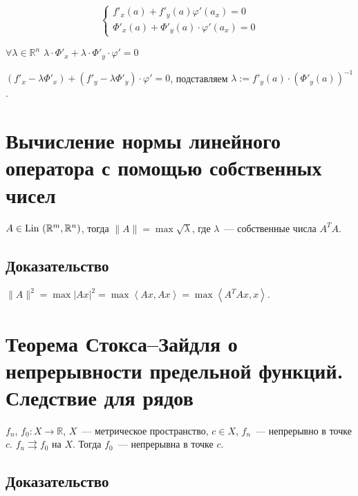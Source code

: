 \documentclass{article}
\begin{document}
            \begin{equation*}
                \begin{cases}
                
                    f'_x(a) + f'_y(a)\varphi'(a_x) = 0 \\
                    
                    \Phi'_x(a) + \Phi'_y(a) \cdot \varphi'(a_x) = 0
                    
                \end{cases}
            \end{equation*}
            
            $\forall \lambda \in \mathbb{R}^n$ $\lambda \cdot \Phi'_x + \lambda \cdot \Phi'_y \cdot \varphi' = 0$
            
            $(f'_x - \lambda \Phi'_x) + (f'_y - \lambda \Phi'_y) \cdot \varphi' = 0$, подставляем $\lambda := f'_y(a) \cdot \left( \Phi'_y (a) \right)^{-1}$.
            
    \newpage
    
    \section{Вычисление нормы линейного оператора с помощью собственных чисел}
    
        $A \in \Lin (\RM, \mathbb{R}^n)$, тогда $\| A \| = \max \sqrt{\lambda}$, где $\lambda$~--- собственные числа $A^T A$.
        
        \subsection{Доказательство}
        
            $\| A \|^2 = \max | Ax |^2 = \max \left\langle Ax, Ax \right\rangle = \max \left\langle A^T Ax, x \right\rangle$.
    
    \newpage
    
    \section{Теорема Стокса--Зайдля о непрерывности предельной функций. Следствие для рядов}
    
        $f_n$, $f_0 : X \rightarrow \mathbb{R}$, $X$~--- метрическое пространство, $c \in X$, $f_n$~--- непрерывно в точке $c$. $f_n \rightrightarrows f_0$ на $X$. Тогда $f_0$~--- непрерывна в точке $c$.
        
        \subsection{Доказательство}
        
\end{document}
